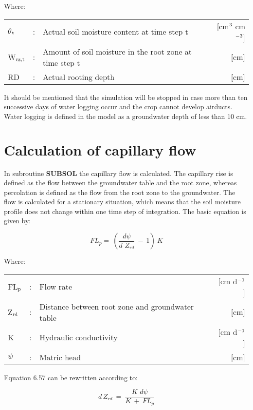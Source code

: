 Where:\\[5pt]
\begin{tabularx}{\textwidth}{llXr}
$\theta$$_{{\rm t}}$ &:& Actual soil moisture content at time step t  & [cm$^{{\rm 3}}$ cm$^{{\rm -3}}$]\\
W$_{{\rm rz,t}}$ &:& Amount of soil moisture in the root zone at time step t  & [cm]\\
RD &:& Actual rooting depth  & [cm]\\
\end{tabularx}

It should be mentioned that the simulation will be stopped in case more than ten successive
days of water logging occur and the crop cannot develop airducts. Water logging is defined
in the model as a groundwater depth of less than 10 cm.

\section{Calculation of capillary flow  }

In subroutine {\bf SUBSOL} the capillary flow is calculated. The capillary rise is defined as
the flow between the groundwater table and the root zone, whereas  percolation is defined
as the flow from the root zone to the groundwater. The flow is calculated for a stationary
situation, which means that the soil moisture profile does not change within one time step
of integration. The basic equation is given by:

\begin{equation}
FL _{p} =~({\frac{d \psi }{ d\,\, Z _{rd} }} ~-~ 1)~K
\end{equation}


Where:\\[5pt]
\begin{tabularx}{\textwidth}{llXr}
FL$_{{\rm p}}$ &:& Flow rate  & [cm d$^{{\rm -1}}$]\\
Z$_{{\rm rd}}$ &:& Distance between root zone and groundwater table  & [cm]\\
K &:& Hydraulic conductivity  & [cm d$^{{\rm -1}}$]\\
$\psi$ &:& Matric head  & [cm]\\
\end{tabularx}

Equation 6.57 can be rewritten according to:

\begin{equation}
d\, Z _{rd} ~=~{\frac{K\,\, d \psi }{ K ~+~ FL _{p} }}
\end{equation}

